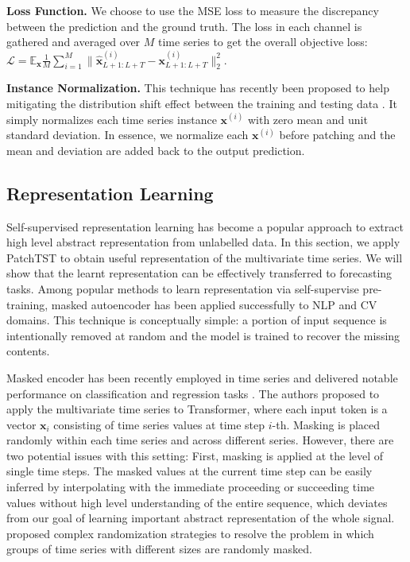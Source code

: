 \documentclass{article} \usepackage{iclr2023_conference,times}
\def\vx{{\bm{x}}}
\newcommand{\E}{\mathbb{E}}
\begin{document}
\iffalse
\textbf{Loss Function.} We choose to use the MSE loss to measure the discrepancy between the prediction and the ground truth. The loss in each channel is $\| \hat{\vx}^{(i)}_{L+1:L+T} - \vx^{(i)}_{L+1:L+T} \|_2^2$ which is gathered and averaged over $M$ time series to get the overall objective loss: 
$$
\mathcal{L} = \E_{\vx} \frac{1}{M}\sum_{i=1}^M \| \hat{\vx}^{(i)}_{L+1:L+T} - \vx^{(i)}_{L+1:L+T} \|_2^2.
$$
\fi
\textbf{Loss Function.} We choose to use the MSE loss to measure the discrepancy between the prediction and the ground truth. The loss in each channel is gathered and averaged over $M$ time series to get the overall objective loss: 
$
\mathcal{L} = \E_{\vx} \frac{1}{M}\sum_{i=1}^M \| \hat{\vx}^{(i)}_{L+1:L+T} - \vx^{(i)}_{L+1:L+T} \|_2^2.
$

\textbf{Instance Normalization.} This technique has recently been proposed to help mitigating the distribution shift effect between the training and testing data \citep{instance,revin}. It simply normalizes each time series instance $\vx^{(i)}$ with zero mean and unit standard deviation. In essence, we normalize each $\vx^{(i)}$ before patching and the mean and deviation are added back to the output prediction.   

\subsection{Representation Learning}
\label{subsec::representation learning}

Self-supervised representation learning has become a popular approach to extract high level abstract representation from unlabelled data. In this section, we apply PatchTST to obtain useful representation of the multivariate time series. We will show that the learnt representation can be effectively transferred to forecasting tasks. Among popular methods to learn representation via self-supervise pre-training, masked autoencoder has been applied successfully to NLP \citep{bert} and CV \citep{mae} domains. This technique is conceptually simple: a portion of input sequence is intentionally removed at random and the model is trained to recover the missing contents. 


Masked encoder has been recently employed in time series and delivered notable performance on classification and regression tasks \citep{tst}. The authors proposed to apply the multivariate time series to Transformer, where each input token is a vector $\vx_i$ consisting of time series values at time step $i$-th. Masking is placed randomly within each time series and across different series. However, there are two potential issues with this setting: First, masking is applied at the level of single time steps. The masked values at the current time step can be easily inferred by interpolating with the immediate proceeding or succeeding time values without high level understanding of the entire sequence, which deviates from our goal of learning important abstract representation of the whole signal. \citet{tst} proposed complex randomization strategies to resolve the problem in which groups of time series with different sizes are randomly masked. 
\end{document}
